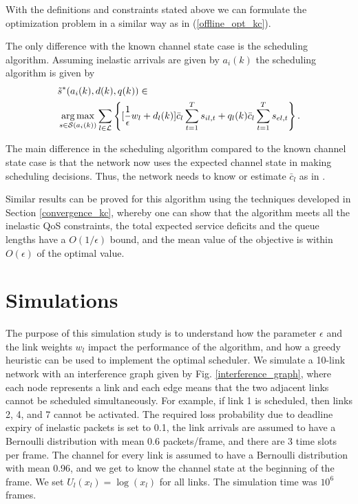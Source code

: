 \documentclass[conference]{IEEEtran}
\begin{document}
With the definitions and constraints stated above we can formulate the optimization problem in a similar way as in (\ref{offline_opt_kc}).

The only difference with the known channel state case is the scheduling algorithm. Assuming inelastic arrivals are given by $a_i(k)$ the scheduling algorithm is given by
\begin{align}
& \tilde{s}^*(a_i(k),d(k),q(k)) \in \notag \\
	& \mathop{\arg\max}\limits_{s \in \mathcal{S}(a_i(k))} \sum\limits_{l \in \mathcal{L}} \left\{ [\frac{1}{\epsilon} w_l+d_l(k)] \bar{c}_l \sum_{t=1}^{T} s_{il,t} + q_l(k) \bar{c}_l \sum_{t=1}^{T} s_{el,t} \right\}. \notag
\end{align}

The main difference in the scheduling algorithm compared to the known channel state case is that the network now uses the expected channel state in making scheduling decisions. Thus, the network needs to know or estimate $\bar{c}_l$ as in \cite{Hou09a}.


Similar results can be proved for this algorithm using the techniques developed in Section \ref{convergence_kc}, whereby one can show that the algorithm meets all the inelastic QoS constraints, the total expected service deficits and the queue lengths have a $O(1 / \epsilon)$ bound, and the mean value of the objective is within $O(\epsilon)$ of the optimal value.





\section{Simulations}

The purpose of this simulation study is to understand how the parameter $\epsilon$ and the link weights $w_l$ impact the performance of the algorithm,  and how a greedy heuristic can be used to implement the optimal scheduler. We simulate a 10-link network with an interference graph given by Fig. \ref{interference_graph}, where each node represents a link and each edge means that the two adjacent links cannot be scheduled simultaneously. For example, if link 1 is scheduled, then links 2, 4, and 7 cannot be activated. The required loss probability due to deadline expiry of inelastic packets is set to 0.1, the link arrivals are assumed to have a Bernoulli distribution with mean 0.6 packets/frame, and there are 3 time slots per frame. The channel for every link is assumed to have a Bernoulli distribution with mean 0.96, and we get to know the channel state at the beginning of the frame. We set $U_l(x_l)=\log(x_l)$ for all links. The simulation time was $10^6$ frames.
\end{document}
